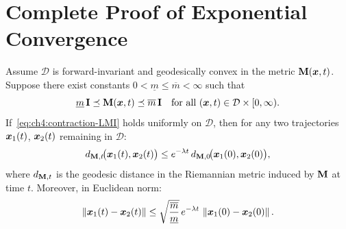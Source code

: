 \section{Complete Proof of Exponential Convergence}

\begin{theorem}
\label{thm:ch4:convergence}
Assume $\mathcal{D}$ is forward-invariant and geodesically convex in the metric
$\mathbf{M}(\bm{x},t)$. Suppose there exist constants $0<\underline{m}\leq\overline{m}<\infty$
such that
\begin{equation}
\underline{m}\,\mathbf{I} \preceq \mathbf{M}(\bm{x},t) \preceq \overline{m}\,\mathbf{I}
\quad\text{for all }(\bm{x},t)\in\mathcal{D}\times[0,\infty).
\label{eq:ch4:metric-bounds}
\end{equation}
If~\eqref{eq:ch4:contraction-LMI} holds uniformly on $\mathcal{D}$, then for any two
trajectories $\bm{x}_1(t)$, $\bm{x}_2(t)$ remaining in $\mathcal{D}$:
\begin{equation}
d_{\mathbf{M},t}\!\bigl(\bm{x}_1(t),\bm{x}_2(t)\bigr)
\leq e^{-\lambda t}\,
d_{\mathbf{M},0}\!\bigl(\bm{x}_1(0),\bm{x}_2(0)\bigr),
\label{eq:ch4:geodesic-decay}
\end{equation}
where $d_{\mathbf{M},t}$ is the geodesic distance in the Riemannian metric induced by
$\mathbf{M}$ at time $t$. Moreover, in Euclidean norm:
\begin{equation}
\left\lVert \bm{x}_1(t)-\bm{x}_2(t) \right\rVert
\leq \sqrt{\frac{\overline{m}}{\underline{m}}}\,
e^{-\lambda t}\,\left\lVert \bm{x}_1(0)-\bm{x}_2(0) \right\rVert.
\label{eq:ch4:euclidean-decay}
\end{equation}
\end{theorem}

